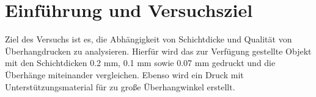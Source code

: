 \documentclass[a4paper,12pt,bibtotocnumbered]{scrartcl}
\numberwithin{equation}{section} %
\begin{document}
\thispagestyle{empty}
\tableofcontents 
\clearpage %


\renewcommand{\thepage}{\arabic{page}}
\setcounter{page}{1}



\listoffigures
{}


\newpage
\onehalfspacing 

\section[Einführung]{Einführung und Versuchsziel}

Ziel des Versuchs ist es, die Abhängigkeit von Schichtdicke und Qualität von Überhangdrucken zu analysieren. Hierfür wird das zur Verfügung gestellte Objekt mit den Schichtdicken 0.2 mm, 0.1 mm sowie 0.07 mm gedruckt und die Überhänge miteinander vergleichen. Ebenso wird ein Druck mit Unterstützungsmaterial für zu große Überhangwinkel erstellt.
\end{document}
